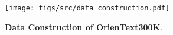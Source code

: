 \begin{figure}[t!]
  \begin{center}
  \texttt{[image: figs/src/data\_construction.pdf]}
  \caption{\textbf{Data Construction of OrienText300K}.} \label{fig:data_construction}
  \end{center}
  \vspace{-10pt}
\end{figure}
